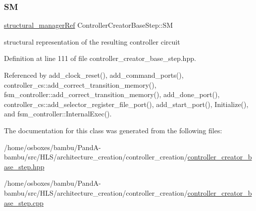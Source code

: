 \subsubsection{\texorpdfstring{SM}{SM}}
{\footnotesize\ttfamily \hyperlink{structural__manager_8hpp_ab3136f0e785d8535f8d252a7b53db5b5}{structural\+\_\+manager\+Ref} Controller\+Creator\+Base\+Step\+::\+SM\hspace{0.3cm}{\ttfamily [protected]}}



structural representation of the resulting controller circuit 



Definition at line 111 of file controller\+\_\+creator\+\_\+base\+\_\+step.\+hpp.



Referenced by add\+\_\+clock\+\_\+reset(), add\+\_\+command\+\_\+ports(), controller\+\_\+cs\+::add\+\_\+correct\+\_\+transition\+\_\+memory(), fsm\+\_\+controller\+::add\+\_\+correct\+\_\+transition\+\_\+memory(), add\+\_\+done\+\_\+port(), controller\+\_\+cs\+::add\+\_\+selector\+\_\+register\+\_\+file\+\_\+port(), add\+\_\+start\+\_\+port(), Initialize(), and fsm\+\_\+controller\+::\+Internal\+Exec().



The documentation for this class was generated from the following files\+:\begin{DoxyCompactItemize}
\item 
/home/osboxes/bambu/\+Pand\+A-\/bambu/src/\+H\+L\+S/architecture\+\_\+creation/controller\+\_\+creation/\hyperlink{controller__creator__base__step_8hpp}{controller\+\_\+creator\+\_\+base\+\_\+step.\+hpp}\item 
/home/osboxes/bambu/\+Pand\+A-\/bambu/src/\+H\+L\+S/architecture\+\_\+creation/controller\+\_\+creation/\hyperlink{controller__creator__base__step_8cpp}{controller\+\_\+creator\+\_\+base\+\_\+step.\+cpp}\end{DoxyCompactItemize}
